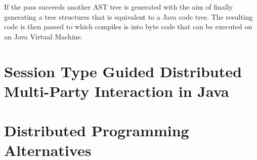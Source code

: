 If the pass succeeds another AST tree is generated with the aim of finally generating a tree structures that is equivalent to a Java code tree. The resulting code is then passed to  which compiles is into byte code that can be executed on an Java Virtual Machine.



	
\section{Session Type Guided Distributed Multi-Party Interaction in Java}
\label{sec:mpstjava}
	
	
\section{Distributed Programming Alternatives}
\label{sec:alternatives}
	


